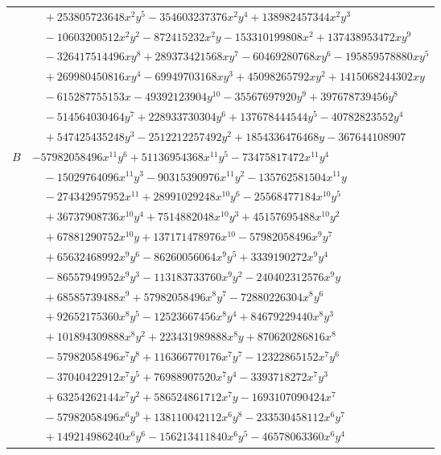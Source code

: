 \documentclass[11pt]{article}
\begin{document}
\begin{longtable}{@{}ll@{}}
 & $\quad +253805723648x^{2}y^{5}-354603237376x^{2}y^{4}+138982457344x^{2}y^{3}$\\
 & $\quad -10603200512x^{2}y^{2}-872415232x^{2}y-153310199808x^{2}+137438953472xy^{9}$\\
 & $\quad -326417514496xy^{8}+289373421568xy^{7}-60469280768xy^{6}-195859578880xy^{5}$\\
 & $\quad +269980450816xy^{4}-69949703168xy^{3}+45098265792xy^{2}+1415068244302xy$\\
 & $\quad -615287755153x-49392123904y^{10}-35567697920y^{9}+397678739456y^{8}$\\
 & $\quad -514564030464y^{7}+228933730304y^{6}+137678444544y^{5}-40782823552y^{4}$\\
 & $\quad +547425435248y^{3}-2512212257492y^{2}+1854336476468y-367644108907$\\
$B$ & $-57982058496x^{11}y^{6}+51136954368x^{11}y^{5}-73475817472x^{11}y^{4}$\\
 & $\quad -15029764096x^{11}y^{3}-90315390976x^{11}y^{2}-135762581504x^{11}y$\\
 & $\quad -274342957952x^{11}+28991029248x^{10}y^{6}-25568477184x^{10}y^{5}$\\
 & $\quad +36737908736x^{10}y^{4}+7514882048x^{10}y^{3}+45157695488x^{10}y^{2}$\\
 & $\quad +67881290752x^{10}y+137171478976x^{10}-57982058496x^{9}y^{7}$\\
 & $\quad +65632468992x^{9}y^{6}-86260056064x^{9}y^{5}+3339190272x^{9}y^{4}$\\
 & $\quad -86557949952x^{9}y^{3}-113183733760x^{9}y^{2}-240402312576x^{9}y$\\
 & $\quad +68585739488x^{9}+57982058496x^{8}y^{7}-72880226304x^{8}y^{6}$\\
 & $\quad +92652175360x^{8}y^{5}-12523667456x^{8}y^{4}+84679229440x^{8}y^{3}$\\
 & $\quad +101894309888x^{8}y^{2}+223431989888x^{8}y+870620286816x^{8}$\\
 & $\quad -57982058496x^{7}y^{8}+116366770176x^{7}y^{7}-12322865152x^{7}y^{6}$\\
 & $\quad -37040422912x^{7}y^{5}+76988907520x^{7}y^{4}-3393718272x^{7}y^{3}$\\
 & $\quad +63254262144x^{7}y^{2}+586524861712x^{7}y-1693107090424x^{7}$\\
 & $\quad -57982058496x^{6}y^{9}+138110042112x^{6}y^{8}-233530458112x^{6}y^{7}$\\
 & $\quad +149214986240x^{6}y^{6}-156213411840x^{6}y^{5}-46578063360x^{6}y^{4}$\\

\end{longtable}
\end{document}
